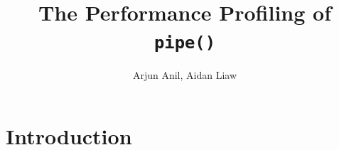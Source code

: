 \documentclass[11pt,sigconf,nonacm]{acmart}
\begin{document}
\title{The Performance Profiling of \texttt{pipe()}}

\author{Arjun Anil, Aidan Liaw}

\renewcommand{\shortauthors}{Anil et al.}




\maketitle


\section{Introduction}
\end{document}
